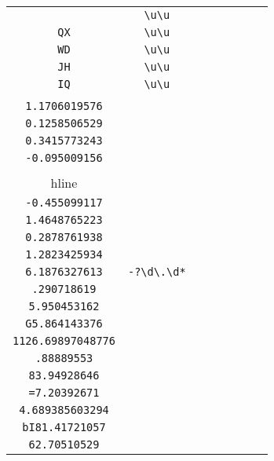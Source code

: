 \begin{longtable}{cccccccc}
\begin{tabular}{ll}
    \verb|NH| & \verb|\u\u|\\
\verb|QX| & \verb|\u\u|\\
\verb|WD| & \verb|\u\u|\\
\verb|JH| & \verb|\u\u|\\
\verb|IQ| & \verb|\u\u|
\end{tabular}
\\\midrule 
\begin{tabular}{l}
    \verb|0.5453040485|\\
\verb|1.1706019576|\\
\verb|0.1258506529|\\
\verb|0.3415773243|\\
\verb|-0.095009156|\\
\\hline\\
\verb|-0.455099117|\\
\verb|1.4648765223|\\
\verb|0.2878761938|\\
\verb|1.2823425934|\\
\verb|6.1876327613|
\end{tabular}

&
\verb|-?\d\.\d*|
&

\begin{tabular}{l}
    \verb|(.)*(\d)*\.(\d)*\d\d\d\d\d\d\d\d|\\
\verb|.290718619|\\
\verb|5.950453162|\\
\verb|G5.864143376|\\
\verb|1126.69897048776|\\
\verb|.88889553|
\end{tabular}

&

\begin{tabular}{l}
    \verb|(.)*(\d)*\.(\d)*\d\d\d\d\d\d\d\d|\\
\verb|83.94928646|\\
\verb|=7.20392671|\\
\verb|4.689385603294|\\
\verb|bI81.41721057|\\
\verb|62.70510529|
\end{tabular}

&


\end{longtable}
